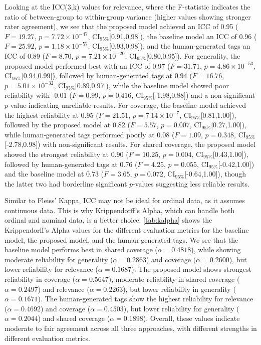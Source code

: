 Looking at the ICC(3,k) values for relevance, where the F-statistic indicates the ratio of between-group to within-group variance (higher values showing stronger rater agreement), we see that the proposed model achieved an ICC of 0.95 ($F=19.27$, $p=7.72\times10^{-47}$, CI$_{95\%}$[0.91,0.98]), the baseline model an ICC of 0.96 ($F=25.92$, $p=1.18\times10^{-57}$, CI$_{95\%}$[0.93,0.98]), and the human-generated tags an ICC of 0.89 ($F=8.70$, $p=7.21\times10^{-20}$, CI$_{95\%}$[0.80,0.95]). For generality, the proposed model performed best with an ICC of 0.97 ($F=31.71$, $p=4.86\times10^{-53}$, CI$_{95\%}$[0.94,0.99]), followed by human-generated tags at 0.94 ($F=16.76$, $p=5.01\times10^{-32}$, CI$_{95\%}$[0.89,0.97]), while the baseline model showed poor reliability with -0.01 ($F=0.99$, $p=0.416$, CI$_{95\%}$[-1.98,0.88]) and a non-significant $p$-value indicating unreliable results. For coverage, the baseline model achieved the highest reliability at 0.95 ($F=21.51$, $p=7.14\times10^{-7}$, CI$_{95\%}$[0.81,1.00]), followed by the proposed model at 0.82 ($F=5.57$, $p=0.007$, CI$_{95\%}$[0.27,1.00]), while human-generated tags performed poorly at 0.08 ($F=1.09$, $p=0.348$, CI$_{95\%}$[-2.78,0.98]) with non-significant results. For shared coverage, the proposed model showed the strongest reliability at 0.90 ($F=10.25$, $p=0.004$, CI$_{95\%}$[0.43,1.00]), followed by human-generated tags at 0.76 ($F=4.25$, $p=0.055$, CI$_{95\%}$[-0.42,1.00]) and the baseline model at 0.73 ($F=3.65$, $p=0.072$, CI$_{95\%}$[-0.64,1.00]), though the latter two had borderline significant $p$-values suggesting less reliable results.

Similar to Fleiss' Kappa, ICC may not be ideal for ordinal data, as it assumes continuous data. This is why Krippendorff's Alpha, which can handle both ordinal and nominal data, is a better choice. \cref{tab:kalpha} shows the Krippendorff's Alpha values for the different evaluation metrics for the baseline model, the proposed model, and the human-generated tags. We see that the baseline model performs best in shared coverage ($\alpha=0.4818$), while showing moderate reliability for generality ($\alpha=0.2863$) and coverage ($\alpha=0.2600$), but lower reliability for relevance ($\alpha=0.1687$). The proposed model shows strongest reliability in coverage ($\alpha=0.5647$), moderate reliability in shared coverage ($\alpha=0.2497$) and relevance ($\alpha=0.2263$), but lower reliability in generality ($\alpha=0.1671$). The human-generated tags show the highest reliability for relevance ($\alpha=0.4692$) and coverage ($\alpha=0.4503$), but lower reliability for generality ($\alpha=0.2044$) and shared coverage ($\alpha=0.1898$). Overall, these values indicate moderate to fair agreement across all three approaches, with different strengths in different evaluation metrics.

